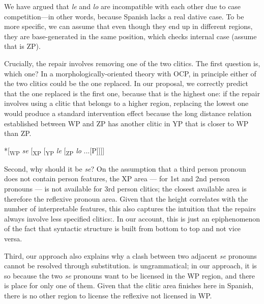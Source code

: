 \documentclass[output=paper,modfonts,nonflat,newtxmath,colorlinks,citecolor=brown]{langsci/langscibook}
\begin{document}
    \label{ex:cabre:23}
    \z



We have argued that \textit{le} and \textit{lo} are incompatible with each other due to case competition—in other words, because Spanish lacks a real dative case. To be more specific, we can assume that even though they end up in different regions, they are base-generated in the same position, which checks internal case (assume that is ZP).

Crucially, the repair involves removing one of the two clitics. The first question is, which one? In a morphologically-oriented theory with OCP, in principle either of the two clitics could be the one replaced. In our proposal, we correctly predict that the one replaced is the first one, because that is the highest one: if the repair involves using a clitic that belongs to a higher region, replacing the lowest one would produce a standard intervention effect because the long distance relation established between WP and ZP has another clitic in YP that is closer to WP than ZP.

\ea%
    \label{ex:cabre:24}
    *[\textsubscript{WP}   \textit{se}  [\textsubscript{XP}  [\textsubscript{YP}  \textit{le}  [\textsubscript{ZP}  \textit{lo} ...[\liv P]]]]

    \z


Second, why should it be \textit{se}? On the assumption that a third person pronoun does not contain person features, the XP area — for 1st and 2nd person pronouns — is not available for 3rd person clitics; the closest available area is therefore the reflexive pronoun area. Given that the height correlates with the number of interpretable features, this also captures the intuition that the repairs always involve less specified clitics:. In our account, this is just an epiphenomenon of the fact that syntactic structure is built from bottom to top and not vice versa.

Third, our approach also explains why a clash between two adjacent \textit{se} pronouns cannot be resolved through substitution.  is ungrammatical; in our approach, it is so because the two \textit{se} pronouns want to be licensed in the WP region, and there is place for only one of them. Given that the clitic area finishes here in Spanish, there is no other region to license the reflexive not licensed in WP.

    \z
\end{document}
